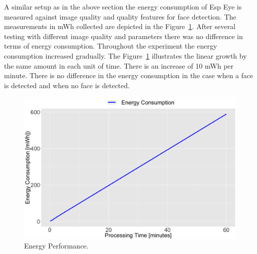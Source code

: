A similar setup as in the above section the energy consumption of Esp Eye is measured against image quality and quality features for face detection. The measurements in mWh collected are depicted in the Figure~\ref{fig:energy}. After several testing with different image quality and parameters there was no difference in terms of energy consumption. Throughout the experiment the energy consumption increased gradually. The Figure~\ref{fig:energy} illustrates the linear growth by the same amount in each unit of time. There is an increase of 10 mWh per minute. There is no difference in the energy consumption in the case when a face is detected and when no face is detected. 



\begin{figure}[!htb]
    \centering
    \includegraphics[width=1\textwidth]{figures/energy.png}
    \caption{Energy Performance.}
    \label{fig:energy}
\end{figure}